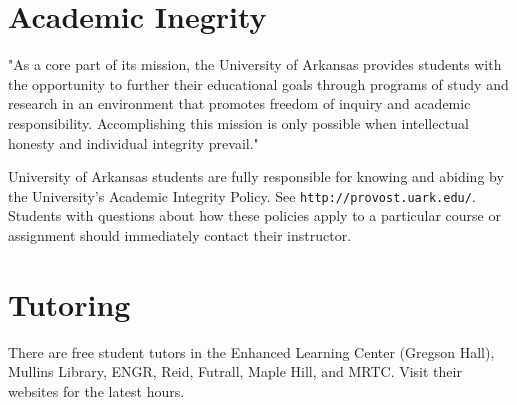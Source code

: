\documentclass[margin,line,pifont,palatino,courier]{res}
\begin{document}
\begin{resume}
\section{\sc Academic Inegrity} "As a core part of its mission, the University of Arkansas provides students with the opportunity to further their educational goals through programs of study and research in an environment that promotes freedom of inquiry and academic responsibility. Accomplishing this mission is only possible when intellectual honesty and individual integrity prevail." 

University of Arkansas students are fully responsible for knowing and abiding by the University's Academic Integrity Policy.  See \verb+http://provost.uark.edu/+. Students with questions about how these policies apply to a particular course or assignment should immediately contact their instructor.

\begin{comment}
\section{\sc Testing Lab \\ Academic Policy} The use of cell phones and any personal media devices (including iPods, PDAs, personal calculators, etc.) in any of the testing labs is strictly prohibited. Turn off all these devices BEFORE entering the Testing Lab and store them with your other belongings. Do not take out or turn on these devices until you have left the Testing Lab. No belongings, including purses or backpacks, may be brought into the lab. There is space allotted for your belongings on the shelves in the Testing Lab or in the lockers outside of SCEN 203. A violation of this policy could result in a non-replaceable zero on the quiz/exam being taken. In addition, you might be required to report to the Office of Community Standards and Student Ethics (OCSSE). 

{\bf The only items allowed at the testing machine are a pen/pencil and your University ID. Calculators and scratch paper are provided by the Testing Lab operator. }
\end{comment}
\section{\sc Tutoring} There are free student tutors in the Enhanced Learning Center (Gregson Hall), Mullins Library, ENGR, Reid, Futrall, Maple Hill, and MRTC. Visit their websites for the latest hours.


\end{resume}
\end{document}
